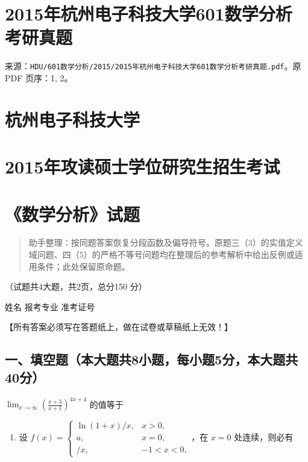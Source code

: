\documentclass[11pt,fontset=fandol]{ctexart}
\providecommand{\tightlist}{\setlength{\itemsep}{0pt}\setlength{\parskip}{0pt}}
\begin{document}
\section{2015年杭州电子科技大学601数学分析考研真题}\label{ux5e74ux676dux5ddeux7535ux5b50ux79d1ux6280ux5927ux5b66601ux6570ux5b66ux5206ux6790ux8003ux7814ux771fux9898}

来源：\texttt{HDU/601数学分析/2015/2015年杭州电子科技大学601数学分析考研真题.pdf}。原
PDF 页序：1, 2。

\section{杭州电子科技大学}\label{ux676dux5ddeux7535ux5b50ux79d1ux6280ux5927ux5b66}

\section{2015年攻读硕士学位研究生招生考试}\label{ux5e74ux653bux8bfbux7855ux58ebux5b66ux4f4dux7814ux7a76ux751fux62dbux751fux8003ux8bd5}

\section{《数学分析》试题}\label{ux6570ux5b66ux5206ux6790ux8bd5ux9898}

\begin{quote}
助手整理：按同题答案恢复分段函数及偏导符号。原题三（3）的实值定义域问题、四（5）的严格不等号问题均在整理后的参考解析中给出反例或适用条件；此处保留原命题。
\end{quote}

（试题共4大题，共2页，总分150 分）

姓名 报考专业 准考证号

【所有答案必须写在答题纸上，做在试卷或草稿纸上无效！】

\subsection{一、填空题（本大题共8小题，每小题5分，本大题共40分）}\label{ux4e00ux586bux7a7aux9898ux672cux5927ux9898ux51718ux5c0fux9898ux6bcfux5c0fux98985ux5206ux672cux5927ux9898ux517140ux5206}

\(\lim _ { x \to \infty } \left( { \frac { x + 3 } { x + 1 } } \right) ^ { 4 x + 4 }\)
的值等于

\begin{enumerate}
\def\labelenumi{\arabic{enumi}.}
\setcounter{enumi}{1}
\tightlist
\item
  设
  \(f(x)=\begin{cases}\ln(1+x)/x,&x>0,\\a,&x=0,\\[\sqrt{1+x}-\sqrt{1-x}]/x,&-1<x<0,\end{cases}\)，在
  \(x=0\) 处连续，则必有
\end{enumerate}
\end{document}
